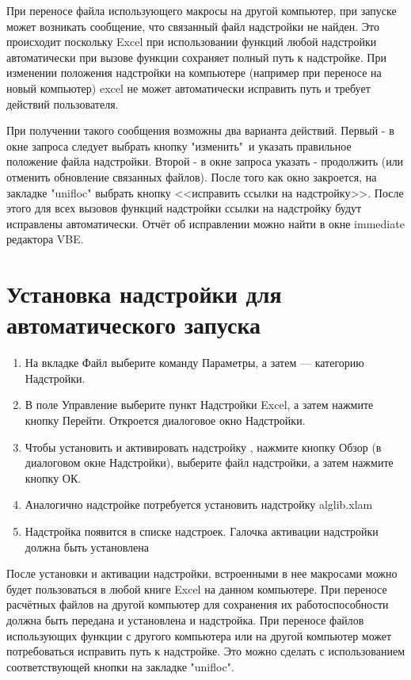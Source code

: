 При переносе файла использующего макросы \unf{} на другой компьютер, при запуске может возникать сообщение, что связанный файл надстройки не найден. Это происходит поскольку Excel при использовании функций любой надстройки автоматически при вызове функции сохраняет полный путь к надстройке. При изменении положения надстройки на компьютере (например при переносе на новый компьютер) excel не может автоматически исправить путь и требует действий пользователя.

При получении такого сообщения возможны два варианта действий. Первый - в окне запроса следует выбрать кнопку "изменить"\ и указать правильное положение файла надстройки. Второй - в окне запроса указать - продолжить (или отменить обновление связанных файлов). После того как окно закроется, на закладке "unifloc" выбрать кнопку <<исправить ссылки на надстройку>>. После этого для всех вызовов функций надстройки \unf ссылки на надстройку будут исправлены автоматически. Отчёт об исправлении можно найти в окне immediate редактора VBE. 


\section{Установка надстройки для автоматического запуска}
\begin{enumerate}
	\item На вкладке Файл выберите команду Параметры, а затем — категорию Надстройки.
	\item В поле Управление выберите пункт Надстройки Excel, а затем нажмите кнопку Перейти. Откроется диалоговое окно Надстройки.
	\item Чтобы установить и активировать надстройку \unf, нажмите кнопку Обзор (в диалоговом окне Надстройки), выберите файл надстройки, а затем нажмите кнопку ОК.
	\item Аналогично надстройке \unf потребуется установить надстройку alglib.xlam 
	\item Надстройка появится в списке надстроек. Галочка активации надстройки должна быть установлена
\end{enumerate}	

После установки и активации надстройки, встроенными в нее макросами можно будет пользоваться в любой книге Excel на данном компьютере. При переносе расчётных файлов на другой компьютер для сохранения их работоспособности должна быть передана и установлена и надстройка. 
При переносе файлов использующих функции \unf с другого компьютера или на другой компьютер может потребоваться исправить путь к надстройке. Это можно сделать с использованием соответствующей кнопки на закладке "unifloc".

